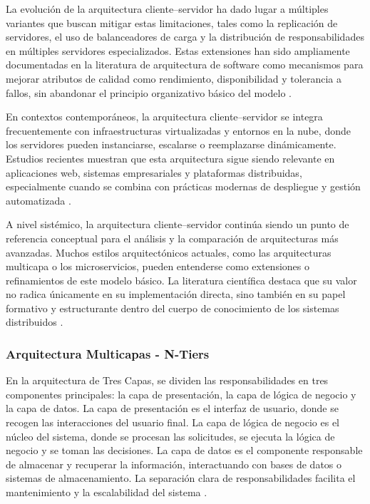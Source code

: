 					La evolución de la arquitectura cliente–servidor ha dado lugar a múltiples variantes que buscan mitigar estas limitaciones, tales como la replicación de servidores, el uso de balanceadores de carga y la distribución de responsabilidades en múltiples servidores especializados. Estas extensiones han sido ampliamente documentadas en la literatura de arquitectura de software como mecanismos para mejorar atributos de calidad como rendimiento, disponibilidad y tolerancia a fallos, sin abandonar el principio organizativo básico del modelo \cite{Coulouris2011Distributed,Ozkaya2020ASurvey}.
					
					En contextos contemporáneos, la arquitectura cliente–servidor se integra frecuentemente con infraestructuras virtualizadas y entornos en la nube, donde los servidores pueden instanciarse, escalarse o reemplazarse dinámicamente. Estudios recientes muestran que esta arquitectura sigue siendo relevante en aplicaciones web, sistemas empresariales y plataformas distribuidas, especialmente cuando se combina con prácticas modernas de despliegue y gestión automatizada \cite{ieeeaccess2025architecture,cloud2023distributed}.
					
					A nivel sistémico, la arquitectura cliente–servidor continúa siendo un punto de referencia conceptual para el análisis y la comparación de arquitecturas más avanzadas. Muchos estilos arquitectónicos actuales, como las arquitecturas multicapa o los microservicios, pueden entenderse como extensiones o refinamientos de este modelo básico. La literatura científica destaca que su valor no radica únicamente en su implementación directa, sino también en su papel formativo y estructurante dentro del cuerpo de conocimiento de los sistemas distribuidos \cite{Tanenbaum2023Distributed,Bass2013Architecture}.
					
			\subsubsection{Arquitectura Multicapas - N-Tiers}
			\noindent
				En la arquitectura de Tres Capas, se dividen las responsabilidades en tres componentes principales: la capa de presentación, la capa de lógica de negocio y la capa de datos. La capa de presentación es el interfaz de usuario, donde se recogen las interacciones del usuario final. La capa de lógica de negocio es el núcleo del sistema, donde se procesan las solicitudes, se ejecuta la lógica de negocio y se toman las decisiones. La capa de datos es el componente responsable de almacenar y recuperar la información, interactuando con bases de datos o sistemas de almacenamiento. La separación clara de responsabilidades facilita el mantenimiento y la escalabilidad del sistema \cite{Soltani2022,Xing2023research}.
				
